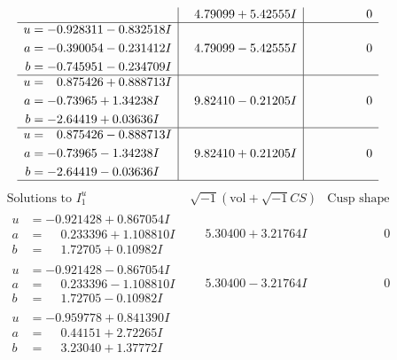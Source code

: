 \documentclass[1p]{elsarticle_modified}
\theoremstyle{definition}
\newcommand{\I}{\sqrt{-1}}
\begin{document}
$$\begin{array}{c|c|c}
 & \phantom{-}4.79099 + 5.42555 I & \phantom{-0.000000 } 0 \\ \hline\begin{aligned}
u &= -0.928311 - 0.832518 I \\
a &= -0.390054 - 0.231412 I \\
b &= -0.745951 - 0.234709 I\end{aligned}
 & \phantom{-}4.79099 - 5.42555 I & \phantom{-0.000000 } 0 \\ \hline\begin{aligned}
u &= \phantom{-}0.875426 + 0.888713 I \\
a &= -0.73965 + 1.34238 I \\
b &= -2.64419 + 0.03636 I\end{aligned}
 & \phantom{-}9.82410 - 0.21205 I & \phantom{-0.000000 } 0 \\ \hline\begin{aligned}
u &= \phantom{-}0.875426 - 0.888713 I \\
a &= -0.73965 - 1.34238 I \\
b &= -2.64419 - 0.03636 I\end{aligned}
 & \phantom{-}9.82410 + 0.21205 I & \phantom{-0.000000 } 0\\
 \hline 
 \end{array}$$\newpage$$\begin{array}{c|c|c}  
\text{Solutions to }I^u_{1}& \I (\text{vol} + \sqrt{-1}CS) & \text{Cusp shape}\\
 \hline 
\begin{aligned}
u &= -0.921428 + 0.867054 I \\
a &= \phantom{-}0.233396 + 1.108810 I \\
b &= \phantom{-}1.72705 + 0.10982 I\end{aligned}
 & \phantom{-}5.30400 + 3.21764 I & \phantom{-0.000000 } 0 \\ \hline\begin{aligned}
u &= -0.921428 - 0.867054 I \\
a &= \phantom{-}0.233396 - 1.108810 I \\
b &= \phantom{-}1.72705 - 0.10982 I\end{aligned}
 & \phantom{-}5.30400 - 3.21764 I & \phantom{-0.000000 } 0 \\ \hline\begin{aligned}
u &= -0.959778 + 0.841390 I \\
a &= \phantom{-}0.44151 + 2.72265 I \\
b &= \phantom{-}3.23040 + 1.37772 I\end{aligned}

\end{array}$$
\end{document}
